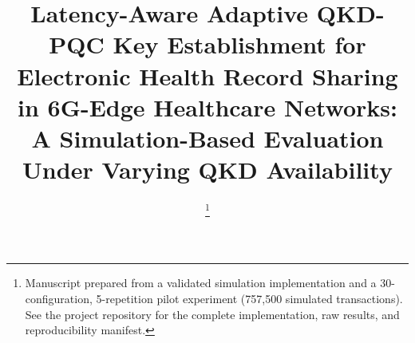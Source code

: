 \documentclass[journal]{IEEEtran}
\begin{document}
\title{Latency-Aware Adaptive QKD-PQC Key Establishment for Electronic Health Record Sharing in 6G-Edge Healthcare Networks: A Simulation-Based Evaluation Under Varying QKD Availability}

\author{
\thanks{Manuscript prepared from a validated simulation implementation and a 30-configuration, 5-repetition pilot experiment (757{,}500 simulated transactions). See the project repository for the complete implementation, raw results, and reproducibility manifest.}
}

\maketitle

\begin{abstract}

\end{abstract}
\end{document}
